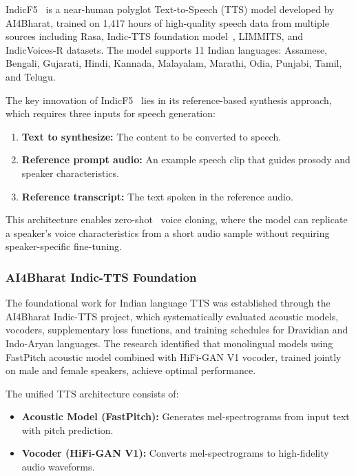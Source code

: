 \documentclass[12pt,oneside]{report}
\begin{document}
IndicF5~\cite{indicf5_2025} is a near-human polyglot Text-to-Speech (TTS) model developed by AI4Bharat, trained on 1,417 hours of high-quality speech data from multiple sources including Rasa, Indic-TTS foundation model~\cite{kumar2023indictts}, LIMMITS, and IndicVoices-R datasets. The model supports 11 Indian languages: Assamese, Bengali, Gujarati, Hindi, Kannada, Malayalam, Marathi, Odia, Punjabi, Tamil, and Telugu.

The key innovation of IndicF5~\cite{indicf5_2025} lies in its reference-based synthesis approach, which requires three inputs for speech generation:
\begin{enumerate}
    \item \textbf{Text to synthesize:} The content to be converted to speech.
    \item \textbf{Reference prompt audio:} An example speech clip that guides prosody and speaker characteristics.
    \item \textbf{Reference transcript:} The text spoken in the reference audio.
\end{enumerate}

This architecture enables zero-shot~\cite{jia2018transfer, indicf5_2025} voice cloning, where the model can replicate a speaker's voice characteristics from a short audio sample without requiring speaker-specific fine-tuning.

\subsubsection{AI4Bharat Indic-TTS Foundation}

The foundational work for Indian language TTS was established through the AI4Bharat Indic-TTS project, which systematically evaluated acoustic models, vocoders, supplementary loss functions, and training schedules for Dravidian and Indo-Aryan languages. The research identified that monolingual models using FastPitch acoustic model combined with HiFi-GAN V1 vocoder, trained jointly on male and female speakers, achieve optimal performance.

The unified TTS architecture consists of:
\begin{itemize}
    \item \textbf{Acoustic Model (FastPitch):} Generates mel-spectrograms from input text with pitch prediction.
    \item \textbf{Vocoder (HiFi-GAN V1):} Converts mel-spectrograms to high-fidelity audio waveforms.
\end{itemize}
\end{document}

